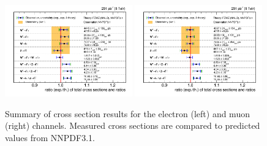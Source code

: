 \begin{figure}[htpb]
\includegraphics[width=0.49\textwidth]{plots/Results/xsecSummary5TeV_ele.png}
\includegraphics[width=0.49\textwidth]{plots/Results/xsecSummary5TeV_muon.png}
\caption{Summary of cross section results for the \sg electron (left) and muon (right) channels. Measured cross sections are compared to predicted values from NNPDF3.1.}
\label{fig:xs:5}
\end{figure}
